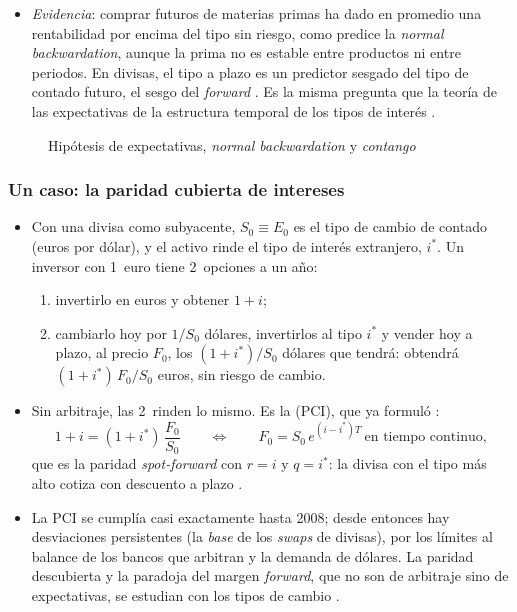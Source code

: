 \documentclass[11pt]{article}
\begin{document}
\begin{itemize}
\item \emph{Evidencia}: comprar futuros de materias primas ha dado en promedio una rentabilidad por encima del tipo sin riesgo, como predice la \emph{normal backwardation}\nocite{GortonRouwenhorst2006Facts}, aunque la prima no es estable entre productos ni entre periodos\nocite{FamaFrench1987Commodity}. En divisas, el tipo a plazo es un predictor sesgado del tipo de contado futuro, el sesgo del \emph{forward}\nocite{Fama1984Forward} . Es la misma pregunta que la teoría de las expectativas de la estructura temporal de los tipos de interés .
\end{itemize}

\begin{figure}[H]
\centering
\caption{Hipótesis de expectativas, \emph{normal backwardation} y \emph{contango}}\label{fig:contango}
\end{figure}

\subsubsection{Un caso: la paridad cubierta de intereses}\label{sec:pci}

\begin{itemize}
\item Con una divisa como subyacente, $S_0\equiv E_0$ es el tipo de cambio de contado (euros por dólar), y el activo rinde el tipo de interés extranjero, $i^{*}$. Un inversor con 1~euro tiene 2~opciones a un año:
  \begin{enumerate}
  \item invertirlo en euros y obtener $1+i$;
  \item cambiarlo hoy por $1/S_0$ dólares, invertirlos al tipo $i^{*}$ y vender hoy a plazo, al precio $F_0$, los $(1+i^{*})/S_0$ dólares que tendrá: obtendrá $(1+i^{*})\,F_0/S_0$ euros, sin riesgo de cambio.
  \end{enumerate}
\item Sin arbitraje, las 2~rinden lo mismo. Es la  (PCI), que ya formuló \textcite{Keynes1923Tract}:
  \begin{equation}\label{eq:pci}
  1+i=(1+i^{*})\,\frac{F_0}{S_0}\qquad\Longleftrightarrow\qquad F_0=S_0\,e^{(i-i^{*})T}\ \text{en tiempo continuo},
  \end{equation}
  que es la paridad \emph{spot-forward} con $r=i$ y $q=i^{*}$: la divisa con el tipo más alto cotiza con descuento a plazo  .
\item La PCI se cumplía casi exactamente hasta 2008; desde entonces hay desviaciones persistentes (la \emph{base} de los \emph{swaps} de divisas), por los límites al balance de los bancos que arbitran y la demanda de dólares\nocite{DuTepperVerdelhan2018Deviations}. La paridad descubierta y la paradoja del margen \emph{forward}, que no son de arbitraje sino de expectativas, se estudian con los tipos de cambio  .
\end{itemize}
\end{document}
